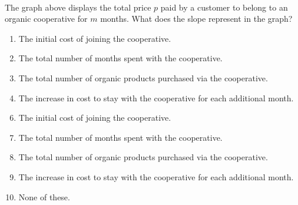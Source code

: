  
\\
The graph above displays the total price $p$ paid by a customer to belong to an organic cooperative for $m$ months.  What does the slope represent in the graph?



\ifsat
	\begin{enumerate}[label=\Alph*)]
		\item The initial cost of joining the cooperative.
		\item The total number of months spent with the cooperative.
		\item The total number of organic products purchased via the cooperative.
		\item The increase in cost to stay with the cooperative for each additional month. %
	\end{enumerate}
\else
\fi

\ifacteven
	\begin{enumerate}[label=\textbf{\Alph*.},itemsep=\fill,align=left]
		\setcounter{enumii}{5}
		\item The initial cost of joining the cooperative.
		\item The total number of months spent with the cooperative.
		\item The total number of organic products purchased via the cooperative.
		\addtocounter{enumii}{1}
		\item The increase in cost to stay with the cooperative for each additional month. %
		\item None of these. 
	\end{enumerate}
\else
\fi

